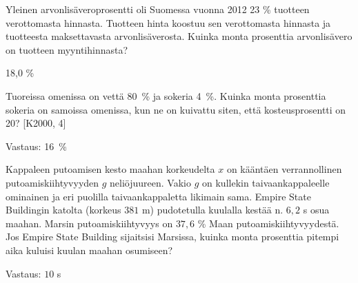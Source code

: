 \begin{tehtava}
Yleinen arvonlisäveroprosentti oli Suomessa vuonna 2012 23 \% tuotteen verottomasta
hinnasta. Tuotteen hinta koostuu sen verottomasta hinnasta
ja tuotteesta maksettavasta arvonlisäverosta. Kuinka monta
prosenttia arvonlisävero on tuotteen myyntihinnasta?
\begin{vastaus}
18,0 \%
\end{vastaus}
\end{tehtava}


\begin{tehtava}
    Tuoreissa omenissa on vettä 80~\% ja sokeria 4~\%. Kuinka monta prosenttia sokeria on samoissa omenissa, kun ne on kuivattu siten, 
    että kosteusprosentti on 20? [K2000, 4]
    
    \begin{vastaus}
        Vastaus: 16~\%
    \end{vastaus}
\end{tehtava}

\begin{tehtava}
    Kappaleen putoamisen kesto maahan korkeudelta $x$ on kääntäen verrannollinen putoamiskiihtyvyyden $g$ neliöjuureen. Vakio $g$ on kullekin     
    taivaankappaleelle ominainen ja eri puolilla taivaankappaletta likimain sama. Empire State Buildingin katolta (korkeus 
    $381$ m) pudotetulla kuulalla kestää n. $6,2$ s osua maahan. Marsin putoamiskiihtyvyys on $37,6$ \% Maan putoamiskiihtyvyydestä. 
    Jos Empire State Building sijaitsisi Marsissa, kuinka monta prosenttia pitempi aika kuluisi kuulan maahan osumiseen?

    \begin{vastaus}
        Vastaus: $10$ s
    \end{vastaus}
\end{tehtava}
